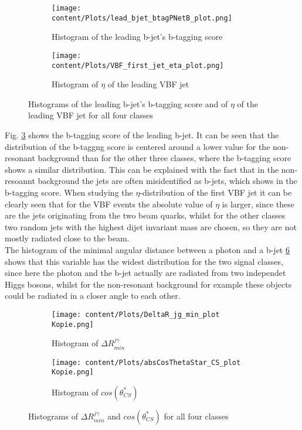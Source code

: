 \begin{figure}[htbp]
    \centering
    \begin{subfigure}{0.45\textwidth}
        \centering
        \texttt{[image: content/Plots/lead\_bjet\_btagPNetB\_plot.png]}
        \caption{Histogram of the leading b-jet's b-tagging score}
        \label{fig:roc1}
    \end{subfigure}
    \hfill
    \begin{subfigure}{0.45\textwidth}
        \centering
        \texttt{[image: content/Plots/VBF\_first\_jet\_eta\_plot.png]}
        \caption{Histogram of $\eta$ of the leading VBF jet}
        \label{fig:roc2}
    \end{subfigure}
    \caption{Histograms of the leading b-jet's b-tagging score and of $\eta$ of the leading VBF jet for all four classes}
    \label{fig:19}
\end{figure}

Fig. \ref{fig:19} shows the b-tagging score of the leading b-jet. It can be seen that the distribution of the b-taggng score is centered around a lower value for the non-resonant background than for the other three classes, where 
the b-tagging score shows a similar distribution. This can be explained with the fact that in the non-resoannt background the jets are often misidentified as b-jets, which shows in the b-tagging score.
When studying the $\eta$-distribution of the first VBF jet it can be clearly seen that for the VBF events the absolute value of $\eta$ is larger, since these are the jets originating from the two beam quarks,
whilst for the other classes two random jets with the highest dijet invariant mass are chosen, so they are not mostly radiated close to the beam. \\

The histogram of the minimal angular distance between a photon and a b-jet \ref{fig:20} shows that this variable
has the widest distribution for the two signal classes, since here the photon and the b-jet actually are radiated from two independet Higgs bosons, whilst for the non-resonant background for example
these objects could be radiated in a closer angle to each other.

\begin{figure}[htbp]
    \centering
    \begin{subfigure}{0.45\textwidth}
        \centering
        \texttt{[image: content/Plots/DeltaR\_jg\_min\_plot Kopie.png]}
        \caption{Histogram of $\Delta R_{min}^{j \gamma}$}
        \label{fig:roc1}
    \end{subfigure}
    \hfill
    \begin{subfigure}{0.45\textwidth}
        \centering
        \texttt{[image: content/Plots/absCosThetaStar\_CS\_plot Kopie.png]}
        \caption{Histogram of $cos(\theta_{CS}^*)$}
        \label{fig:roc2}
    \end{subfigure}
    \caption{Histograms of $\Delta R_{min}^{j \gamma}$ and $cos(\theta_{CS}^*)$ for all four classes}
    \label{fig:20}
\end{figure}


